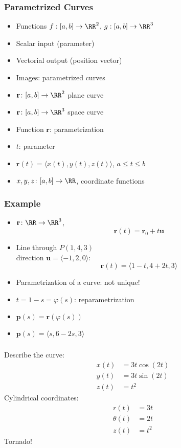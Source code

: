 \begin{frame}
 \frametitle{Parametrized Curves}
    \begin{itemize}
    \item Functions $f: [a,b] \to \RR^2$, $g: [a,b] \to \RR^3$
      \item Scalar input (parameter)
      \item Vectorial output (position vector)
      \item Images: parametrized curves
      \item $\textbf{r} \colon [a,b] \to \RR^2$ plane curve
      \item $\textbf{r} \colon [a,b] \to \RR^3$ space curve\pause
      \item Function $\textbf{r}$: parametrization\pause
      \item $t$: parameter
      \item $\textbf{r}(t) = \langle x(t), y(t), z(t)\rangle$,
      $a \leqslant t \leqslant b$
      \item $x,y,z \colon [a,b] \to \RR$, coordinate functions
    \end{itemize}
\end{frame}

\begin{frame}
  \frametitle{Example}

    \begin{itemize}
    \item $\textbf{r} \colon \RR \to \RR^3$,
    $$\textbf{r}(t) = \textbf{r}_0 +t\textbf{u}$$
    \item Line through $P(1,4,3)$\\
    direction $\textbf{u}=\langle -1,2,0\rangle$:\pause
    $$\textbf{r}(t) = \langle 1-t,4+2t,3\rangle$$\pause
    \item Parametrization of a curve: not unique!
    \item $t=1-s=\varphi(s)$: reparametrization
    \item $\textbf{p}(s) = \textbf{r}(\varphi(s))$
    \item $\textbf{p}(s) = \langle s, 6-2s, 3\rangle$
    \end{itemize}
\end{frame}

\begin{frame}
  \frametitle{}

    Describe the curve:
    \begin{align*}
      x(t) & = 3t\cos{(2t)}\\
      y(t) & = 3t\sin{(2t)}\\
      z(t) & = t^2
    \end{align*}
    \pause Cylindrical coordinates:
    \begin{align*}
      r(t) & = 3t\\
      \theta(t) & = 2t \\
      z(t) & = t^2
    \end{align*}
    \pause Tornado!
\end{frame}

